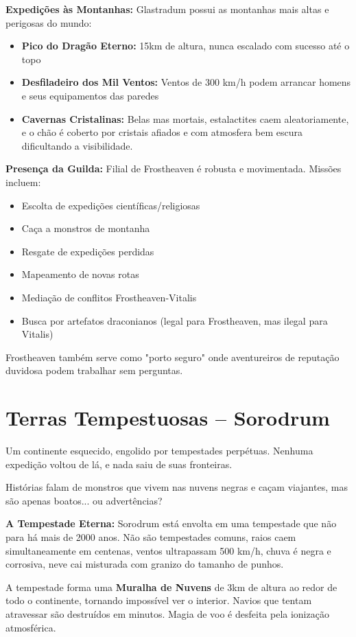 \textbf{\ringmfamily Expedições às Montanhas:}
Glastradum possui as montanhas mais altas e perigosas do mundo:
\begin{itemize}
    \item \textbf{Pico do Dragão Eterno:} 15km de altura, nunca escalado com sucesso até o topo
    \item \textbf{Desfiladeiro dos Mil Ventos:} Ventos de 300 km/h podem arrancar homens e seus equipamentos das paredes
    \item \textbf{Cavernas Cristalinas:} Belas mas mortais, estalactites caem aleatoriamente, e o chão é coberto por cristais afiados e com atmosfera bem escura dificultando a visibilidade.
\end{itemize}

\textbf{\ringmfamily Presença da Guilda:}
Filial de Frostheaven é robusta e movimentada. Missões incluem:
\begin{itemize}
    \item Escolta de expedições científicas/religiosas
    \item Caça a monstros de montanha
    \item Resgate de expedições perdidas
    \item Mapeamento de novas rotas
    \item Mediação de conflitos Frostheaven-Vitalis
    \item Busca por artefatos draconianos (legal para Frostheaven, mas ilegal para Vitalis)
\end{itemize}
Frostheaven também serve como "porto seguro" onde aventureiros de reputação duvidosa podem trabalhar sem perguntas.

\section*{Terras Tempestuosas – Sorodrum}
Um continente esquecido, engolido por tempestades perpétuas. Nenhuma expedição voltou de lá, e nada saiu de suas fronteiras.

Histórias falam de monstros que vivem nas nuvens negras e caçam viajantes, mas são apenas boatos... ou advertências?

\textbf{\ringmfamily A Tempestade Eterna:}
Sorodrum está envolta em uma tempestade que não para há mais de 2000 anos. Não são tempestades comuns, raios caem simultaneamente em centenas, ventos ultrapassam 500 km/h, chuva é negra e corrosiva, neve cai misturada com granizo do tamanho de punhos.

A tempestade forma uma \textbf{Muralha de Nuvens} de 3km de altura ao redor de todo o continente, tornando impossível ver o interior. Navios que tentam atravessar são destruídos em minutos. Magia de voo é desfeita pela ionização atmosférica.

